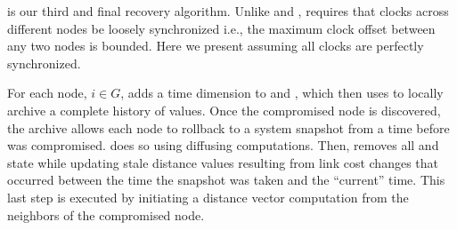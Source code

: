  is our third and final recovery algorithm. 
Unlike \second and \purges, \cpr requires that clocks across different nodes be loosely synchronized i.e., the maximum clock offset between
any two nodes is bounded. Here we present \cpr assuming all clocks are perfectly synchronized. 

For each node, $i \in G$, \cpr adds a time dimension to \minvi and \dmatrixis, which \cpr then uses to locally archive a complete history of values.  
Once the compromised node is discovered, the archive allows each node to rollback to a system snapshot from a time before \bad was compromised. 
\cpr does so using diffusing computations.  Then, \cpr removes all \badvector and \oldvector state while updating stale distance values resulting from link cost changes that
occurred between the time the snapshot was taken and the ``current'' time.
This last step is executed by initiating a distance vector computation from the neighbors of the compromised node.




